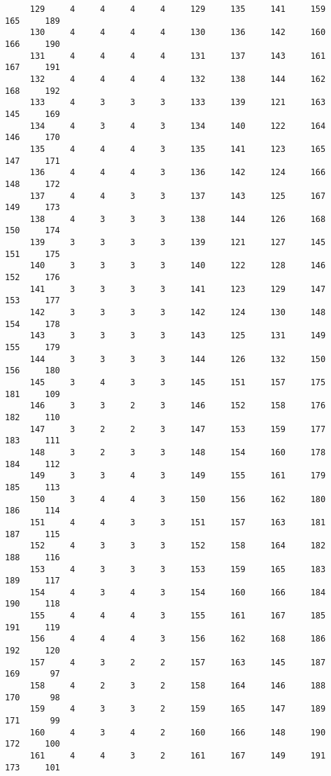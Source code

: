 \begin{verbatim}
     129     4     4     4     4     129     135     141     159     165     189
     130     4     4     4     4     130     136     142     160     166     190
     131     4     4     4     4     131     137     143     161     167     191
     132     4     4     4     4     132     138     144     162     168     192
     133     4     3     3     3     133     139     121     163     145     169
     134     4     3     4     3     134     140     122     164     146     170
     135     4     4     4     3     135     141     123     165     147     171
     136     4     4     4     3     136     142     124     166     148     172
     137     4     4     3     3     137     143     125     167     149     173
     138     4     3     3     3     138     144     126     168     150     174
     139     3     3     3     3     139     121     127     145     151     175
     140     3     3     3     3     140     122     128     146     152     176
     141     3     3     3     3     141     123     129     147     153     177
     142     3     3     3     3     142     124     130     148     154     178
     143     3     3     3     3     143     125     131     149     155     179
     144     3     3     3     3     144     126     132     150     156     180 
     145     3     4     3     3     145     151     157     175     181     109 
     146     3     3     2     3     146     152     158     176     182     110
     147     3     2     2     3     147     153     159     177     183     111
     148     3     2     3     3     148     154     160     178     184     112
     149     3     3     4     3     149     155     161     179     185     113
     150     3     4     4     3     150     156     162     180     186     114
     151     4     4     3     3     151     157     163     181     187     115
     152     4     3     3     3     152     158     164     182     188     116
     153     4     3     3     3     153     159     165     183     189     117
     154     4     3     4     3     154     160     166     184     190     118
     155     4     4     4     3     155     161     167     185     191     119
     156     4     4     4     3     156     162     168     186     192     120
     157     4     3     2     2     157     163     145     187     169      97
     158     4     2     3     2     158     164     146     188     170      98
     159     4     3     3     2     159     165     147     189     171      99
     160     4     3     4     2     160     166     148     190     172     100
     161     4     4     3     2     161     167     149     191     173     101

\end{verbatim}
